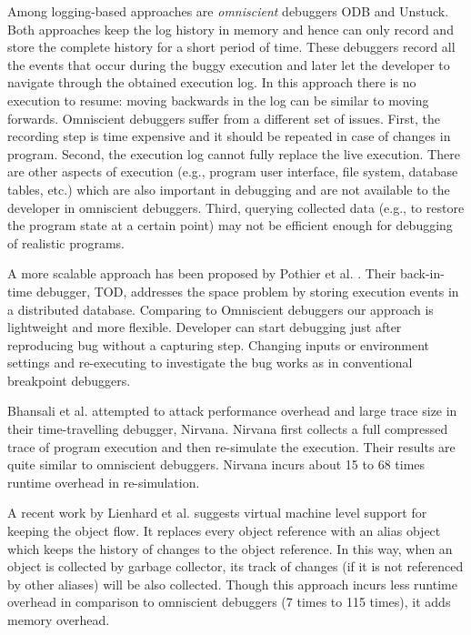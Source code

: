 \documentclass{sig-alternate}
\begin{document}
Among logging-based approaches are \textit{omniscient} debuggers
ODB\cite{Lewis} and Unstuck\cite{Hofer}. Both
approaches keep the log history in memory and hence can only record
and store the complete history for a short period of time. These
debuggers record all the events that occur during the buggy execution
and later let the developer to navigate through the obtained execution
log. In this approach there is no execution to resume: moving
backwards in the log can be similar to moving forwards. Omniscient
debuggers suffer from a different set of issues. First, the recording
step is time expensive and it should be repeated in case of changes in
program. Second, the execution log cannot fully replace the live
execution. There are other aspects of execution (e.g., program user
interface, file system, database tables, etc.) which are also
important in debugging and are not available to the developer in
omniscient debuggers. Third, querying collected data (e.g., to restore
the program state at a certain point) may not be efficient enough for
debugging of realistic programs.

A more scalable approach has been proposed by Pothier et
al. \cite{Pothier}. Their back-in-time debugger, TOD, addresses the
space problem by storing execution events in a distributed
database. Comparing to Omniscient debuggers our approach is
lightweight and more flexible. Developer can start debugging just
after reproducing bug without a capturing step.  Changing inputs or
environment settings and re-executing to investigate the bug works as
in conventional breakpoint debuggers.

Bhansali et al. \cite{Bhansali} attempted to attack performance overhead 
and large trace size in their time-travelling debugger, Nirvana. Nirvana 
first collects a full compressed trace of program execution and then 
re-simulate the execution. Their results are quite similar to omniscient 
debuggers. Nirvana incurs about 15 to 68 times runtime overhead in 
re-simulation.

A recent work by Lienhard et al.\cite{Lienhard} suggests virtual
machine level support for keeping the object flow. It replaces every
object reference with an alias object which keeps the history of
changes to the object reference. In this way, when an object is
collected by garbage collector, its track of changes (if it is not
referenced by other aliases) will be also collected. Though this
approach incurs less runtime overhead in
comparison to omniscient debuggers (7 times to 115 times), it adds memory
overhead. 
\end{document}
